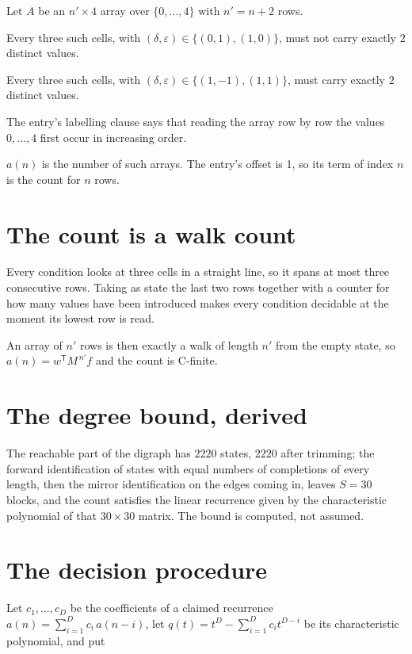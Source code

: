 \documentclass[11pt]{article}
\theoremstyle{definition}
\begin{document}
Let $A$ be an $n' \times 4$ array over $\{0,\dots,4\}$ with $n' = n + 2$ rows.

Every three such cells, with $(\delta,\varepsilon) \in \{(0,1), (1,0)\}$, must not carry exactly $2$ distinct values.

Every three such cells, with $(\delta,\varepsilon) \in \{(1,-1), (1,1)\}$, must carry exactly $2$ distinct values.

The entry's labelling clause says that reading the array row by row the values $0,\dots,4$ first occur in increasing order.

$a(n)$ is the number of such arrays. The entry's offset is 1, so its term of index $n$ is the count for $n$ rows.

\section{The count is a walk count}

Every condition looks at three cells in a straight line, so it spans at most three consecutive rows. Taking as state the last two rows together with a counter for how many values have been introduced makes every condition decidable at the moment its lowest row is read.

An array of $n'$ rows is then exactly a walk of length $n'$ from the empty state, so $a(n) = w^{\mathsf T}M^{\,n'}f$ and the count is C-finite.

\section{The degree bound, derived}

The reachable part of the digraph has $2220$ states, $2220$ after trimming; the forward identification of states with equal numbers of completions of every length, then the mirror identification on the edges coming in, leaves $S = 30$ blocks, and the count satisfies the linear recurrence given by the characteristic polynomial of that $30\times30$ matrix. The bound is computed, not assumed.

\section{The decision procedure}

Let $c_1,\dots,c_D$ be the coefficients of a claimed recurrence $a(n) = \sum_{i=1}^{D} c_i\,a(n-i)$, let $q(t) = t^{D} - \sum_{i=1}^{D} c_i t^{D-i}$ be its characteristic polynomial, and put
\end{document}
